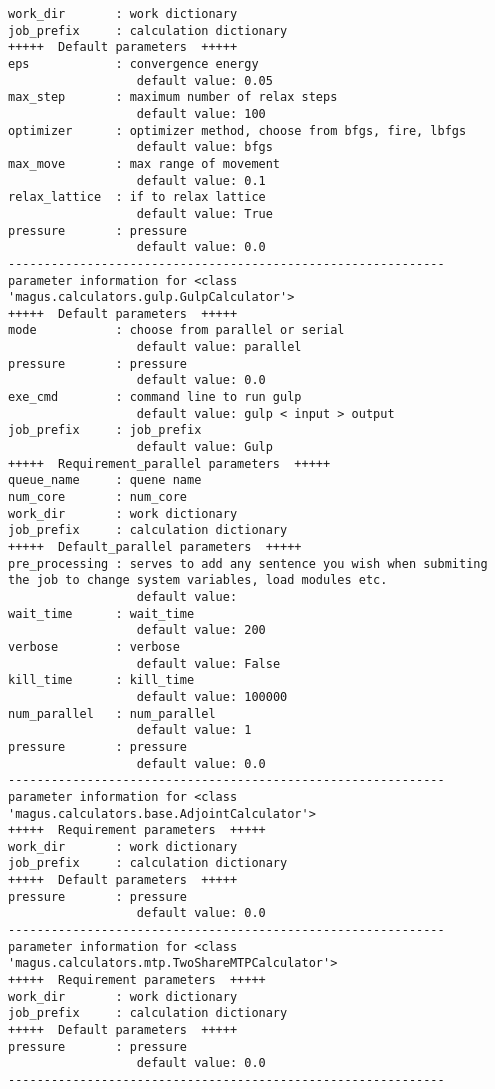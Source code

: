 \documentclass[12pt,oneside]{book}
\begin{document}
\begin{tcolorbox}
\begin{verbatim}
work_dir       : work dictionary
job_prefix     : calculation dictionary
+++++  Default parameters  +++++
eps            : convergence energy
                  default value: 0.05
max_step       : maximum number of relax steps
                  default value: 100
optimizer      : optimizer method, choose from bfgs, fire, lbfgs
                  default value: bfgs
max_move       : max range of movement
                  default value: 0.1
relax_lattice  : if to relax lattice
                  default value: True
pressure       : pressure
                  default value: 0.0
-------------------------------------------------------------
parameter information for <class 'magus.calculators.gulp.GulpCalculator'>
+++++  Default parameters  +++++
mode           : choose from parallel or serial
                  default value: parallel
pressure       : pressure
                  default value: 0.0
exe_cmd        : command line to run gulp
                  default value: gulp < input > output
job_prefix     : job_prefix
                  default value: Gulp
+++++  Requirement_parallel parameters  +++++
queue_name     : quene name
num_core       : num_core
work_dir       : work dictionary
job_prefix     : calculation dictionary
+++++  Default_parallel parameters  +++++
pre_processing : serves to add any sentence you wish when submiting the job to change system variables, load modules etc.
                  default value: 
wait_time      : wait_time
                  default value: 200
verbose        : verbose
                  default value: False
kill_time      : kill_time
                  default value: 100000
num_parallel   : num_parallel
                  default value: 1
pressure       : pressure
                  default value: 0.0
-------------------------------------------------------------
parameter information for <class 'magus.calculators.base.AdjointCalculator'>
+++++  Requirement parameters  +++++
work_dir       : work dictionary
job_prefix     : calculation dictionary
+++++  Default parameters  +++++
pressure       : pressure
                  default value: 0.0
-------------------------------------------------------------
parameter information for <class 'magus.calculators.mtp.TwoShareMTPCalculator'>
+++++  Requirement parameters  +++++
work_dir       : work dictionary
job_prefix     : calculation dictionary
+++++  Default parameters  +++++
pressure       : pressure
                  default value: 0.0
-------------------------------------------------------------
    \end{verbatim}
\end{tcolorbox}
\end{document}
